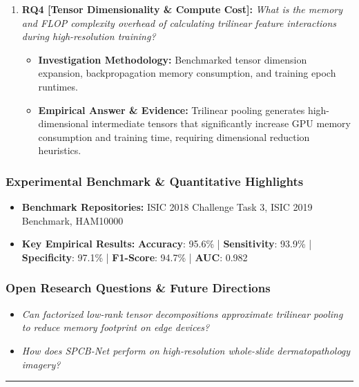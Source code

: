 \begin{enumerate}[label=\textbf{\arabic*.}, leftmargin=*]
\begin{itemize}[leftmargin=1.5em]
  \end{itemize}
  \item \textbf{RQ4 [Tensor Dimensionality \& Compute Cost]:} \textit{What is the memory and FLOP complexity overhead of calculating trilinear feature interactions during high-resolution training?}
  \begin{itemize}[leftmargin=1.5em]
    \item \textbf{Investigation Methodology:} Benchmarked tensor dimension expansion, backpropagation memory consumption, and training epoch runtimes.
    \item \textbf{Empirical Answer \& Evidence:} Trilinear pooling generates high-dimensional intermediate tensors that significantly increase GPU memory consumption and training time, requiring dimensional reduction heuristics.
  \end{itemize}
\end{enumerate}

\subsubsection*{Experimental Benchmark \& Quantitative Highlights}
\begin{itemize}[leftmargin=*]
  \item \textbf{Benchmark Repositories:} ISIC 2018 Challenge Task 3, ISIC 2019 Benchmark, HAM10000
  \item \textbf{Key Empirical Results:} \textbf{Accuracy}: 95.6\% \quad | \quad \textbf{Sensitivity}: 93.9\% \quad | \quad \textbf{Specificity}: 97.1\% \quad | \quad \textbf{F1-Score}: 94.7\% \quad | \quad \textbf{AUC}: 0.982
\end{itemize}

\subsubsection*{Open Research Questions \& Future Directions}
\begin{itemize}[leftmargin=*]
  \item \textit{Can factorized low-rank tensor decompositions approximate trilinear pooling to reduce memory footprint on edge devices?}
  \item \textit{How does SPCB-Net perform on high-resolution whole-slide dermatopathology imagery?}
\end{itemize}
\vspace{0.8em}\hrule\vspace{1.2em}
